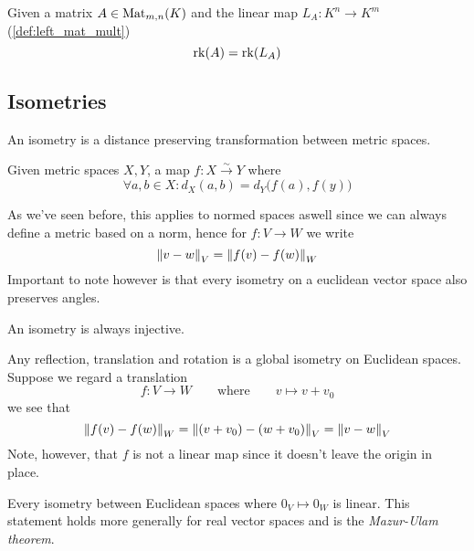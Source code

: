 \begin{theorem}[\(\rk(A) = \rk(L_A)\)]
   Given a matrix \(A \in \operatorname{Mat}_{m,n}(K)\) and the linear map \(L_{A}: K^n \to K^m\) (\ref{def:left_mat_mult})
   \[\operatorname{rk}(A) = \operatorname{rk}(L_A)\]
\end{theorem}

\subsection{Isometries}
An isometry is a distance preserving transformation between metric spaces.
\begin{definition}[Isometry]
   Given metric spaces \(X, Y\), a map \(f: X \xrightarrow{\sim} Y\) where
   \[\forall a, b \in X: d_X(a, b) = d_Y\big(f(a), f(y)\big)\]
\end{definition}
\begin{remark}
   As we've seen before, this applies to normed spaces aswell since we can always define a metric based on a norm, hence for \(f: V \to W\) we write
   \[\left\lVert v - w\right\rVert_V = \left\lVert f(v) - f(w)\right\rVert_W\]
   Important to note however is that every isometry on a euclidean vector space also preserves angles.
\end{remark}
\begin{remark}
   An isometry is always injective.
\end{remark}
\begin{example}
   Any reflection, translation and rotation is a global isometry on Euclidean spaces.
   Suppose we regard a translation
   \[f: V \to W \qquad\text{where}\qquad v \mapsto v + v_0\]
   we see that
   \[\left\lVert f(v) - f(w)\right\rVert_W = \left\lVert(v + v_0) - (w + v_0)\right\rVert_V = \left\lVert v - w\right\rVert_V\]
   Note, however, that \(f\) is not a linear map since it doesn't leave the origin in place.
\end{example}

Every isometry between Euclidean spaces where \(0_V \mapsto 0_W\) is linear.
This statement holds more generally for real vector spaces and is the \emph{Mazur-Ulam theorem}.


